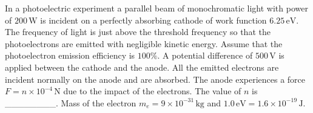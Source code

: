 
    \item In a photoelectric experiment a parallel beam of monochromatic light with power of \(200 \, \text{W}\) is incident on a perfectly absorbing cathode of work function \(6.25 \, \text{eV}\). The frequency of light is just above the threshold frequency so that the photoelectrons are emitted with negligible kinetic energy. Assume that the photoelectron emission efficiency is \(100\%\). A potential difference of \(500 \, \text{V}\) is applied between the cathode and the anode. All the emitted electrons are incident normally on the anode and are absorbed. The anode experiences a force \(F = n \times 10^{-4} \, \text{N}\) due to the impact of the electrons. The value of \(n\) is \_\_\_\_\_\_\_\_. Mass of the electron \(m_e = 9 \times 10^{-31} \, \text{kg}\) and \(1.0 \, \text{eV} = 1.6 \times 10^{-19} \, \text{J}\).

